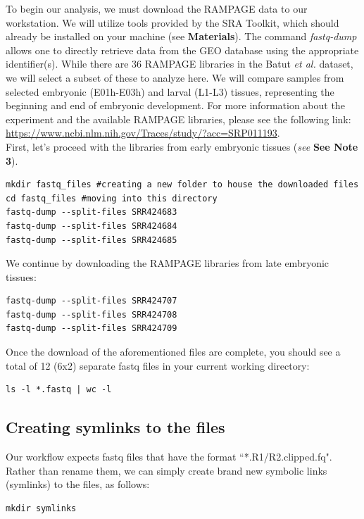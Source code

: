 \documentclass[runningheads,a4paper]{llncs}
\begin{document}
\begin{linenumbers}
To begin our analysis, we must download the RAMPAGE data to our workstation. 
We will utilize tools provided by the SRA Toolkit, which should already be installed on your machine (see \textbf{Materials}).
The command \textit{fastq-dump} allows one to directly retrieve data from the GEO database using the appropriate identifier(s).
While there are 36 RAMPAGE libraries in the Batut \textit{et al.} dataset, we will select a subset of these to analyze here.
We will compare samples from selected embryonic (E01h-E03h) and larval (L1-L3) tissues, representing the beginning and end of embryonic development.
For more information about the experiment and the available RAMPAGE libraries, please see the following link: \url{https://www.ncbi.nlm.nih.gov/Traces/study/?acc=SRP011193}.\\

First, let's proceed with the libraries from early embryonic tissues (\textit{see} \textbf{See Note 3}).

\noindent
\begin{verbatim}
mkdir fastq_files #creating a new folder to house the downloaded files
cd fastq_files #moving into this directory
fastq-dump --split-files SRR424683
fastq-dump --split-files SRR424684
fastq-dump --split-files SRR424685
\end{verbatim}

We continue by downloading the RAMPAGE libraries from late embryonic tissues:

\noindent
\begin{verbatim}
fastq-dump --split-files SRR424707
fastq-dump --split-files SRR424708
fastq-dump --split-files SRR424709
\end{verbatim}  

Once the download of the aforementioned files are complete, you should see a total of 12 (6x2) separate fastq files in your current working directory:

\noindent
\begin{verbatim}
ls -l *.fastq | wc -l
\end{verbatim}

\subsection{Creating symlinks to the files}
Our workflow expects fastq files that have the format ``*.R1/R2.clipped.fq". 
Rather than rename them, we can simply create brand new symbolic links (symlinks) to the files, as follows:

\noindent
\begin{verbatim}
mkdir symlinks


\end{verbatim}
\end{linenumbers}
\end{document}
